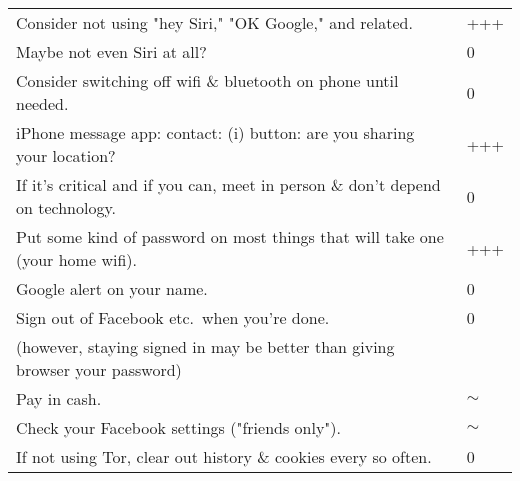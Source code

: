 \documentclass{tufte-handout}
\begin{document}
\begin{tabular}{p{5in}l}
Consider not using "hey Siri," "OK Google," and related. & +++ \\

Maybe not even Siri at all? & 0 \\

Consider switching off wifi \& bluetooth on phone until needed. & 0 \\

iPhone message app: contact: (i) button: are you sharing your location? & +++ \\

If it's critical and if you can, meet in person \& don't depend on technology. & 0 \\

Put some kind of password on most things that will take one (your home wifi). & +++ \\

Google alert on your name. & 0 \\

Sign out of Facebook etc.\ when you're done. & 0 \\

\qquad \small(however, staying signed in may be better than giving browser your password) \\

Pay in cash. & $\sim$ \\

Check your Facebook settings ("friends only"). & $\sim$ \\

If not using Tor, clear out history \& cookies every so often. & 0 \\



\end{tabular}
\end{document}
